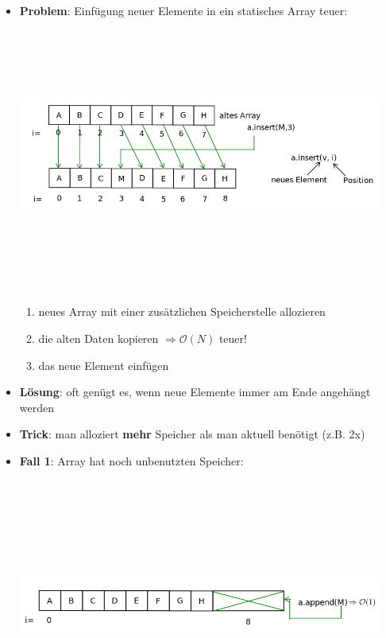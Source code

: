 \documentclass[11pt, fleqn]{scrreprt}
\begin{document}
\begin{itemize}
	\item \textbf{Problem}: Einfügung neuer Elemente in ein statisches Array teuer: \\
	\includegraphics[width=12cm,height=9cm,keepaspectratio]{./Pictures/dynamischesArray.png}
	\begin{enumerate}
		\item neues Array mit einer zusätzlichen Speicherstelle allozieren
		\item die alten Daten kopieren $\Rightarrow \mathcal{O}(N)$ teuer!
		\item das neue Element einfügen
	\end{enumerate}
	\item \textbf{Lösung}: oft genügt es, wenn neue Elemente immer am Ende angehängt werden 
	\item \textbf{Trick}: man alloziert \textbf{mehr} Speicher als man aktuell benötigt (z.B. 2x)
	\item \textbf{Fall 1}: Array hat noch unbenutzten Speicher: \\
	\includegraphics[width=12cm,height=9cm,keepaspectratio]{./Pictures/dynArrunbenutzt.png}

\end{itemize}
\end{document}
